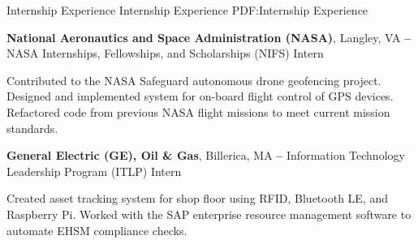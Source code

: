 \Section
{Internship Experience}
{Internship Experience}
{PDF:Internship Experience}

\Entry
\textbf{National Aeronautics and Space Administration (NASA)},
Langley, VA
\dotfill
\textbf{ -- }
\SubEntry
\Gap
NASA Internships, Fellowships, and Scholarships (NIFS) Intern
\begin{Detail}
    \SubBulletItem
    Contributed to the NASA Safeguard autonomous drone geofencing project.
    \SubBulletItem
    Designed and implemented system for on-board flight control of GPS devices.
    \SubBulletItem
    Refactored code from previous NASA flight missions to meet current mission standards.
\end{Detail}

\Entry
\BigGap
\textbf{General Electric (GE), Oil \& Gas},
Billerica, MA
\dotfill
\textbf{ --
}
\SubEntry
\Gap
Information Technology Leadership Program (ITLP) Intern
\begin{Detail}
    \SubBulletItem
    Created asset tracking system for shop floor using RFID, Bluetooth LE, and Raspberry Pi.
    \SubBulletItem
    Worked with the SAP enterprise resource management software to automate EHSM compliance checks.
\end{Detail}
